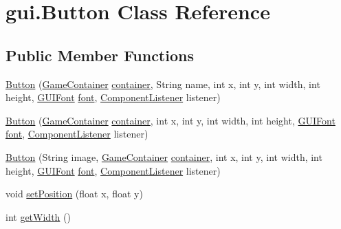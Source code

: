 \hypertarget{classgui_1_1_button}{}\section{gui.\+Button Class Reference}
\label{classgui_1_1_button}
\subsection*{Public Member Functions}
\begin{DoxyCompactItemize}
\item 
\mbox{\hyperlink{classgui_1_1_button_a9d43604fe7ed9d76404abba348ff731e}{Button}} (\mbox{\hyperlink{classorg_1_1newdawn_1_1slick_1_1_game_container}{Game\+Container}} \mbox{\hyperlink{classgui_1_1_button_a91cd8f6ba1fa010f564dcbc4561ce9a7}{container}}, String name, int x, int y, int width, int height, \mbox{\hyperlink{classgui_1_1_g_u_i_font}{G\+U\+I\+Font}} \mbox{\hyperlink{classgui_1_1_button_a7f22b2fc3bd45d47a55a2d3ef20e5452}{font}}, \mbox{\hyperlink{interfaceorg_1_1newdawn_1_1slick_1_1gui_1_1_component_listener}{Component\+Listener}} listener)
\item 
\mbox{\hyperlink{classgui_1_1_button_a63b4d24c1da8b52b6ea75d6e885e1140}{Button}} (\mbox{\hyperlink{classorg_1_1newdawn_1_1slick_1_1_game_container}{Game\+Container}} \mbox{\hyperlink{classgui_1_1_button_a91cd8f6ba1fa010f564dcbc4561ce9a7}{container}}, int x, int y, int width, int height, \mbox{\hyperlink{classgui_1_1_g_u_i_font}{G\+U\+I\+Font}} \mbox{\hyperlink{classgui_1_1_button_a7f22b2fc3bd45d47a55a2d3ef20e5452}{font}}, \mbox{\hyperlink{interfaceorg_1_1newdawn_1_1slick_1_1gui_1_1_component_listener}{Component\+Listener}} listener)
\item 
\mbox{\hyperlink{classgui_1_1_button_a9cccf685f91dd107de82319b145bba52}{Button}} (String image, \mbox{\hyperlink{classorg_1_1newdawn_1_1slick_1_1_game_container}{Game\+Container}} \mbox{\hyperlink{classgui_1_1_button_a91cd8f6ba1fa010f564dcbc4561ce9a7}{container}}, int x, int y, int width, int height, \mbox{\hyperlink{classgui_1_1_g_u_i_font}{G\+U\+I\+Font}} \mbox{\hyperlink{classgui_1_1_button_a7f22b2fc3bd45d47a55a2d3ef20e5452}{font}}, \mbox{\hyperlink{interfaceorg_1_1newdawn_1_1slick_1_1gui_1_1_component_listener}{Component\+Listener}} listener)
\item 
void \mbox{\hyperlink{classgui_1_1_button_a53a5e304756fbb7bfe9030f9f260507d}{set\+Position}} (float x, float y)
\item 
int \mbox{\hyperlink{classgui_1_1_button_acfe5d0facf304d658a27e35022e83ddb}{get\+Width}} ()

\end{DoxyCompactItemize}
